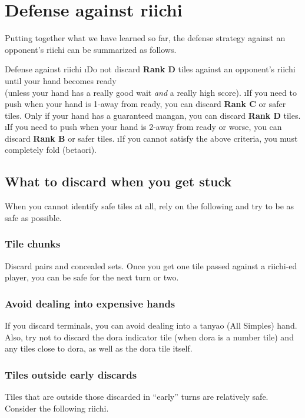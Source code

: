 {{\newpage
\section{Defense against {\jap riichi}} \label{sec:defense_riichi}

Putting together what we have learned so far, the defense strategy against an opponent's {\jap riichi} can be summarized as follows. 

\begin{itembox}[c]{Defense against {\jap riichi}}
\bi
\i Do not discard {\bf Rank D} tiles against an opponent's {\jap riichi} until your 
hand becomes ready\\(unless your hand has a really good wait \emph{and} a really high score).
\i If you need to push when your hand is 1-away from ready, you can
discard {\bf Rank C} or safer tiles. Only if your hand has a guaranteed {\jap mangan}, you can discard {\bf Rank D} tiles. 
\i If you need to push when your hand is 2-away from ready or worse,
you can discard {\bf Rank B} or safer tiles. 
\i If you cannot satisfy the above criteria, you must completely fold ({\jap betaori}). 
\ei
\end{itembox}

\subsection{What to discard when you get stuck}
When you cannot identify safe tiles at all, rely on the following and try to be as safe as possible. 

\subsubsection*{Tile chunks}
Discard pairs and concealed sets. Once you get one tile passed against a {\jap riichi}-ed player, you can be safe for the next turn or two. 

\subsubsection*{Avoid dealing into expensive hands}
If you discard terminals, you can avoid dealing into a {\jap tanyao} (All Simples) hand. 
Also, try not to discard the {\jap dora} indicator tile (when {\jap dora} is a number tile) and any tiles close to {\jap dora}, as well as the {\jap dora} tile itself.

\subsubsection*{Tiles outside early discards}
Tiles that are outside those discarded in ``early'' turns are relatively safe. 
Consider the following {\jap riichi}. 

}}
